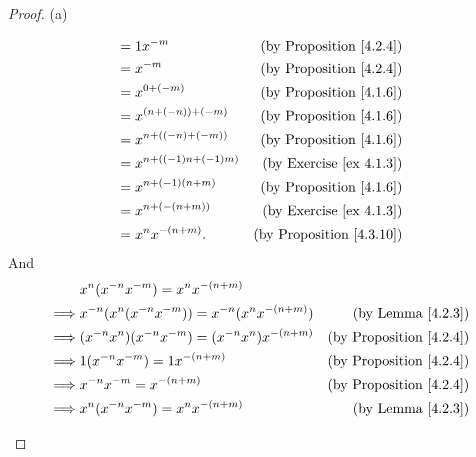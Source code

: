 \begin{proof}{(a)}
\begin{enumerate}[label=(\Roman*)]
\begin{enumerate}[label=(\roman*)]
\begin{enumerate}[label=(\arabic*)]
\begin{align*}
                                       & = 1x^{-m}                 & \text{(by Proposition \ref{4.2.4})}  \\
                                       & = x^{-m}                  & \text{(by Proposition \ref{4.2.4})}  \\
                                       & = x^{0 + (-m)}            & \text{(by Proposition \ref{4.1.6})}  \\
                                       & = x^{(n + (-n)) + (-m)}   & \text{(by Proposition \ref{4.1.6})}  \\
                                       & = x^{n + ((-n) + (-m))}   & \text{(by Proposition \ref{4.1.6})}  \\
                                       & = x^{n + ((-1)n + (-1)m)} & \text{(by Exercise \ref{ex 4.1.3})}  \\
                                       & = x^{n + (-1)(n + m)}     & \text{(by Proposition \ref{4.1.6})}  \\
                                       & = x^{n + (-(n + m))}      & \text{(by Exercise \ref{ex 4.1.3})}  \\
                                       & = x^n x^{-(n + m)}.       & \text{(by Proposition \ref{4.3.10})} \\
                                  \end{align*}
                                  And
                                  \begin{align*}
                                               & x^n (x^{-n} x^{-m}) = x^n x^{-(n + m)}                                                         \\
                                      \implies & x^{-n} (x^n (x^{-n} x^{-m})) = x^{-n} (x^n x^{-(n + m)}) & \text{(by Lemma \ref{4.2.3})}       \\
                                      \implies & (x^{-n} x^n)(x^{-n} x^{-m}) = (x^{-n} x^n)x^{-(n + m)}   & \text{(by Proposition \ref{4.2.4})} \\
                                      \implies & 1(x^{-n} x^{-m}) = 1x^{-(n + m)}                         & \text{(by Proposition \ref{4.2.4})} \\
                                      \implies & x^{-n} x^{-m} = x^{-(n + m)}                             & \text{(by Proposition \ref{4.2.4})} \\
                                      \implies & x^n (x^{-n} x^{-m}) = x^n x^{-(n + m)}                   & \text{(by Lemma \ref{4.2.3})}       \\

\end{align*}
\end{enumerate}
\end{enumerate}
\end{enumerate}
\end{proof}
